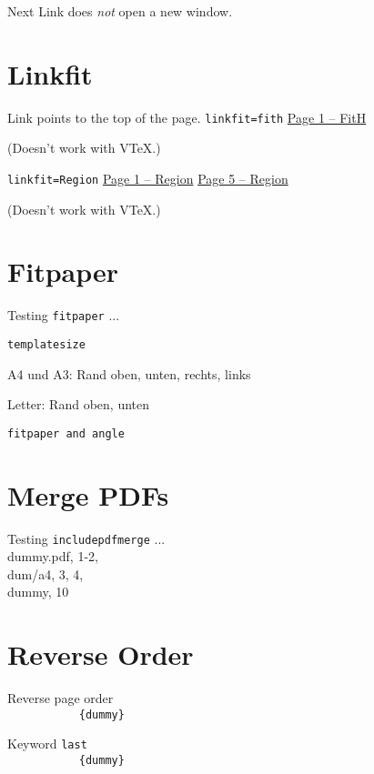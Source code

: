 \begingroup
Next Link does \emph{not} open a new window.

\endgroup

\section{Linkfit}
\begingroup
Link points to the top of the page. \texttt{linkfit=fith}
\hyperlink{dummy.pdf.1}{Page 1 -- FitH}
\par(Doesn't work with VTeX.)

\texttt{linkfit=Region}
\hyperlink{foobar.1}{Page 1 -- Region}
\hyperlink{foobar.5}{Page 5 -- Region}
\par(Doesn't work with VTeX.)

\endgroup

\section{Fitpaper}
\begingroup
Testing \texttt{fitpaper} ...

%
\texttt{templatesize}
\par A4 und A3: Rand oben, unten, rechts, links
\par Letter: Rand oben, unten

%
\texttt{fitpaper and angle}


\endgroup


\section{Merge PDFs}
\begingroup
Testing \texttt{includepdfmerge} ...
\\dummy.pdf, 1-2, \\dum/a4, 3, 4, \\dummy, 10
\endgroup


\section{Reverse Order}
\begingroup
Reverse page order\\
\verb||
\verb|           {dummy}|

Keyword \verb|last|\\
\verb||
\verb|           {dummy}|

\endgroup



